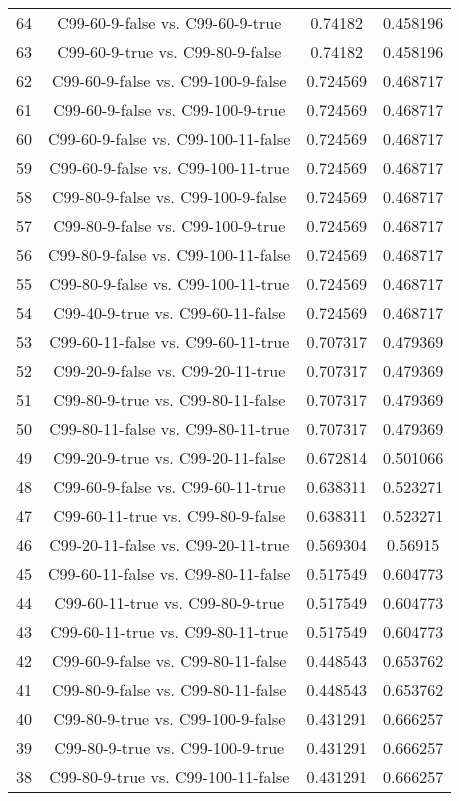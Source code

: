 \documentclass[a4paper,10pt]{article}
\begin{document}
\begin{landscape}
\begin{table}[!htp]
\begin{tabular}{cccc}
64&C99-60-9-false vs. C99-60-9-true&0.74182&0.458196\\
63&C99-60-9-true vs. C99-80-9-false&0.74182&0.458196\\
62&C99-60-9-false vs. C99-100-9-false&0.724569&0.468717\\
61&C99-60-9-false vs. C99-100-9-true&0.724569&0.468717\\
60&C99-60-9-false vs. C99-100-11-false&0.724569&0.468717\\
59&C99-60-9-false vs. C99-100-11-true&0.724569&0.468717\\
58&C99-80-9-false vs. C99-100-9-false&0.724569&0.468717\\
57&C99-80-9-false vs. C99-100-9-true&0.724569&0.468717\\
56&C99-80-9-false vs. C99-100-11-false&0.724569&0.468717\\
55&C99-80-9-false vs. C99-100-11-true&0.724569&0.468717\\
54&C99-40-9-true vs. C99-60-11-false&0.724569&0.468717\\
53&C99-60-11-false vs. C99-60-11-true&0.707317&0.479369\\
52&C99-20-9-false vs. C99-20-11-true&0.707317&0.479369\\
51&C99-80-9-true vs. C99-80-11-false&0.707317&0.479369\\
50&C99-80-11-false vs. C99-80-11-true&0.707317&0.479369\\
49&C99-20-9-true vs. C99-20-11-false&0.672814&0.501066\\
48&C99-60-9-false vs. C99-60-11-true&0.638311&0.523271\\
47&C99-60-11-true vs. C99-80-9-false&0.638311&0.523271\\
46&C99-20-11-false vs. C99-20-11-true&0.569304&0.56915\\
45&C99-60-11-false vs. C99-80-11-false&0.517549&0.604773\\
44&C99-60-11-true vs. C99-80-9-true&0.517549&0.604773\\
43&C99-60-11-true vs. C99-80-11-true&0.517549&0.604773\\
42&C99-60-9-false vs. C99-80-11-false&0.448543&0.653762\\
41&C99-80-9-false vs. C99-80-11-false&0.448543&0.653762\\
40&C99-80-9-true vs. C99-100-9-false&0.431291&0.666257\\
39&C99-80-9-true vs. C99-100-9-true&0.431291&0.666257\\
38&C99-80-9-true vs. C99-100-11-false&0.431291&0.666257\\

\end{tabular}
\end{table}
\end{landscape}
\end{document}
